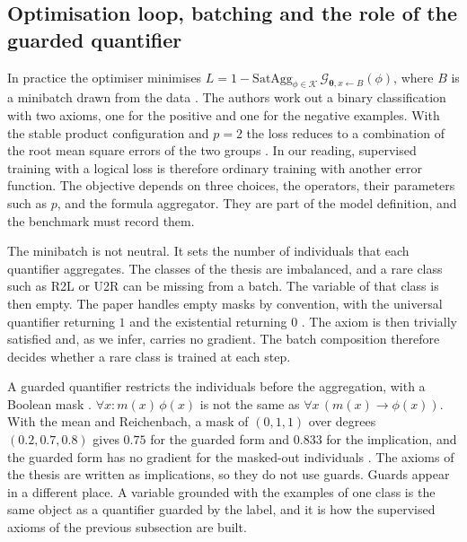 \subsection{Optimisation loop, batching and the role of the guarded quantifier}
\label{sec:optimisation-loop}

In practice the optimiser minimises
$L=1-\mathrm{SatAgg}_{\phi\in\mathcal{K}}\,\mathcal{G}_{\boldsymbol{\theta},
x\leftarrow B}(\phi)$, where $B$ is a minibatch drawn from the data
\citep{badreddine2022ltn}. The authors work out a binary classification with
two axioms, one for the positive and one for the negative examples. With the
stable product configuration and $p=2$ the loss reduces to a combination of
the root mean square errors of the two groups \citep{badreddine2022ltn}.
In our reading, supervised training with a logical loss is therefore ordinary
training with another error function. The objective depends on three choices, the operators,
their parameters such as $p$, and the formula aggregator. They are part of the
model definition, and the benchmark must record them.

The minibatch is not neutral. It sets the number of individuals that each
quantifier aggregates. The classes of the thesis are imbalanced, and a rare
class such as R2L or U2R can be missing from a batch. The variable of that
class is then empty. The paper handles empty masks by convention, with the
universal quantifier returning $1$ and the existential returning $0$
\citep{badreddine2022ltn}. The axiom is then trivially satisfied and, as we
infer, carries no gradient. The batch composition therefore decides whether a
rare class is trained at each step.

A guarded quantifier restricts the individuals before the aggregation, with a
Boolean mask \citep{badreddine2022ltn}. $\forall x:m(x)\,\phi(x)$ is not the
same as $\forall x\,(m(x)\rightarrow\phi(x))$. With the mean and Reichenbach,
a mask of $(0,1,1)$ over degrees $(0.2,0.7,0.8)$ gives $0.75$ for the guarded
form and $0.833$ for the implication, and the guarded form has no gradient for
the masked-out individuals \citep{badreddine2022ltn}. The axioms of the
thesis are written as implications, so they do not use guards. Guards appear
in a different place. A variable grounded with the examples of one class is
the same object as a quantifier guarded by the label, and it is how the
supervised axioms of the previous subsection are built.

